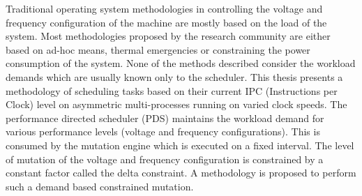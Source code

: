 Traditional operating system methodologies in controlling the voltage and 
frequency configuration of the machine are mostly based on the load of the
system. Most methodologies proposed by the research community are either
based on ad-hoc means, thermal emergencies or constraining the power
consumption of the system. None of the methods described consider the 
workload demands which are usually known only to the scheduler. This
thesis presents a methodology of scheduling tasks based on their current
IPC (Instructions per Clock) level on asymmetric multi-processes running
on varied clock speeds. The performance directed scheduler (PDS) maintains 
the workload demand for various performance levels (voltage and frequency configurations).
This is consumed by the mutation engine which is executed on a fixed interval.
The level of mutation of the voltage and frequency configuration is constrained
by a constant factor called the delta constraint. A methodology is proposed
to perform such a demand based constrained mutation. 